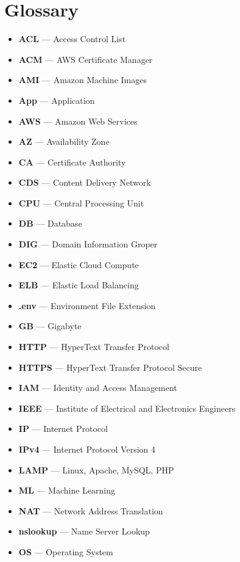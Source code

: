 \chapter{Glossary}\label{ch:glossary}

\begin{itemize}
    \item  \textbf{ACL} — Access Control List
    \item  \textbf{ACM} — AWS Certificate Manager
    \item  \textbf{AMI} — Amazon Machine Images
    \item  \textbf{App} — Application
    \item  \textbf{AWS} — Amazon Web Services
    \item  \textbf{AZ} — Availability Zone
    \item  \textbf{CA} — Certificate Authority
    \item  \textbf{CDS} — Content Delivery Network
    \item  \textbf{CPU} — Central Processing Unit
    \item  \textbf{DB} — Database
    \item  \textbf{DIG} — Domain Information Groper
    \item  \textbf{EC2} — Elastic Cloud Compute
    \item  \textbf{ELB} — Elastic Load Balancing
    \item  \textbf{.env} — Environment File Extension
    \item  \textbf{GB} — Gigabyte
    \item  \textbf{HTTP} — HyperText Transfer Protocol
    \item  \textbf{HTTPS} — HyperText Transfer Protocol Secure
    \item  \textbf{IAM} — Identity and Access Management
    \item  \textbf{IEEE} — Institute of Electrical and Electronics Engineers
    \item  \textbf{IP} — Internet Protocol
    \item  \textbf{IPv4} — Internet Protocol Version 4
    \item  \textbf{LAMP} — Linux, Apache, MySQL, PHP
    \item  \textbf{ML} — Machine Learning
    \item  \textbf{NAT} — Network Address Translation
    \item  \textbf{nslookup} — Name Server Lookup
    \item  \textbf{OS} — Operating System

\end{itemize}
